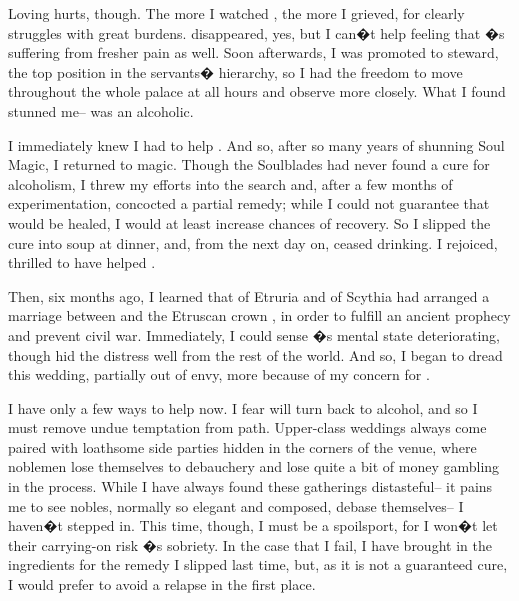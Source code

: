 \documentclass[char]{Kos}
\begin{document}
Loving \cBride{\them} hurts, though. The more I watched \cBride{\them}, the more I grieved, for \cBride{\they} clearly struggles with great burdens. \cBride{\Their} \cFugitive{\sibling} disappeared, yes, but I can�t help feeling that \cBride{\nickname}�s suffering from fresher pain as well. Soon afterwards, I was promoted to steward, the top position in the servants� hierarchy, so I had the freedom to move throughout the whole palace at all hours and observe \cBride{\them} more closely. What I found stunned me-- \cBride{\they} was an alcoholic.

I immediately knew I had to help \cBride{\them}. And so, after so many years of shunning Soul Magic, I returned to magic. Though the Soulblades had never found a cure for alcoholism, I threw my efforts into the search and, after a few months of experimentation, concocted a partial remedy; while I could not guarantee that \cBride{\they} would be healed, I would at least increase \cBride{\their} chances of recovery. So I slipped the cure into \cBride{\their} soup at dinner, and, from the next day on, \cBride{\they} ceased drinking. I rejoiced, thrilled to have helped \cBride{\them}.

Then, six months ago, I learned that \cEtruriaKing{\Monarch} \cEtruriaKing{\nickname} of Etruria and \cScythiaKing{\Monarch} \cScythiaKing{\nickname} of Scythia had arranged a marriage between \cBride{\nickname} and the Etruscan crown \cGroom{\prince} \cGroom{\nickname}, in order to fulfill an ancient prophecy and prevent civil war. Immediately, I could sense \cBride{\nickname}�s mental state deteriorating, though \cBride{\they} hid the distress well from the rest of the world. And so, I began to dread this wedding, partially out of envy, more because of my concern for \cBride{\them}.

I have only a few ways to help \cBride{\them} now. I fear \cBride{\they} will turn back to alcohol, and so I must remove undue temptation from \cBride{\their} path. Upper-class weddings always come paired with loathsome side parties hidden in the corners of the venue, where noblemen lose themselves to debauchery and lose quite a bit of money gambling in the process. While I have always found these gatherings distasteful-- it pains me to see nobles, normally so elegant and composed, debase themselves-- I haven�t stepped in. This time, though, I must be a spoilsport, for I won�t let their carrying-on risk \cBride{\nickname}�s sobriety. In the case that I fail, I have brought in the ingredients for the remedy I slipped \cBride{\them} last time, but, as it is not a guaranteed cure, I would prefer to avoid a relapse in the first place.
\end{document}
